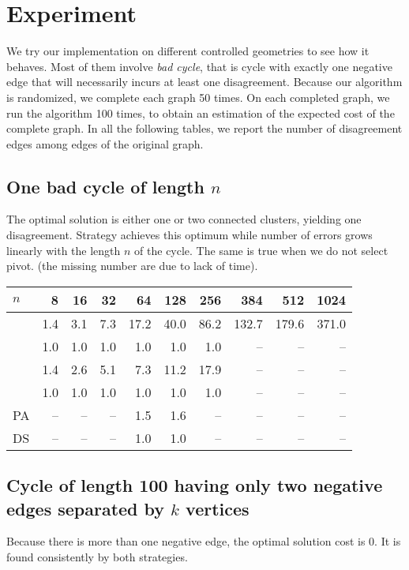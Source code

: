 \section{Experiment}

We try our implementation on different controlled geometries to see how it
behaves. Most of them involve \emph{bad cycle}, that is cycle with exactly one
negative edge that will necessarily incurs at least one disagreement.  Because
our algorithm is randomized, we complete each graph 50 times.  On each
completed graph, we run the \ccp{} algorithm 100 times, to obtain an
estimation of the expected cost of the complete graph. In all the following
tables, we report the number of disagreement edges among edges of the original
graph.

\subsection{One bad cycle of length $n$}
\label{sub:cycle}

The optimal solution is either one or two connected clusters, yielding one
disagreement. Strategy \pat{} achieves this optimum while \pot{} number of
errors grows linearly with the length $n$ of the cycle. The same is true when
we do not select pivot. (the missing number are due to lack of time).

\begin{center}
\begin{tabular}{lrrrrrrrrr}
\toprule
$n$      & 8   & 16  & 32  & 64   & 128  & 256  & 384   & 512   & 1024 \\
\midrule
\pot{}  & 1.4 & 3.1 & 7.3 & 17.2 & 40.0 & 86.2 & 132.7 & 179.6 & 371.0 \\
\pat{}  & 1.0 & 1.0 & 1.0 & 1.0  & 1.0  & 1.0  & --    & --    & -- \\
\nnot{} & 1.4 & 2.6 & 5.1 & 7.3  & 11.2 & 17.9 & --    & --    & --\\
\nat{}  & 1.0 & 1.0 & 1.0 & 1.0  & 1.0  & 1.0  & --    & --    & --\\
PA      & --  & --  & --  & 1.5   & 1.6   & --   & --    & --    & --\\
DS	    & --  & --  & --  & 1.0   & 1.0   & --   & --    & --    & --\\
\bottomrule
\end{tabular}
\end{center}



\subsection{Cycle of length 100 having only two negative edges separated by
	$k$ vertices}
Because there is more than one negative edge, the optimal solution cost is 0.
It is found consistently by both strategies.

